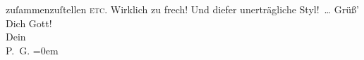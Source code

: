 \begin{ledgroupsized}[t]{13cm}
               zuſammenzuſtellen \textsc{etc}. Wirklich zu frech! Und diefer
               unerträgliche Styl! {\dots}\pend
           \pstart
           Grüß’ Dich Gott! {\\[\baselineskip]}Dein {\\[\baselineskip]}\spacefill\mbox{P. G.}\pend
           \leftskip=0em{}
         
         \endnumbering{}\end{ledgroupsized}  \newcommand{\dateiname}{L02718}\newcommand{\titel}{Paul Goldmann an Arthur Schnitzler, [zwischen 29. 9. und 2. 10. 1893]}\newcommand{\editorInnen}{Martin Anton Müller und Laura Untner}
      